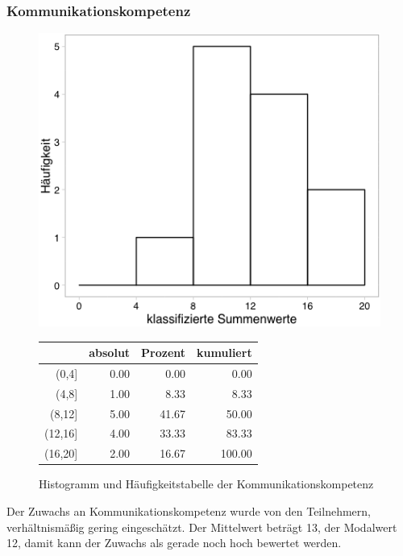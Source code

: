 \documentclass[12pt, bibliography=totoc]{scrartcl}
\begin{document}
\subsubsection{Kommunikationskompetenz}\label{kommunikationskompetenz}

\begin{figure}[H]
\begin{minipage}{.4\linewidth}
\includegraphics[width=0.8\linewidth]{Anhang/KKHistnn.png}

\label{pic:aufbau}
\end{minipage}
\begin{minipage}{.4\linewidth}
\centering
\raisebox{\depth}
{\begin{tabular}{rrrr}
  \hline
 & absolut & Prozent & kumuliert \\
  \hline
(0,4] & 0.00 & 0.00 & 0.00 \\
  (4,8] & 1.00 & 8.33 & 8.33 \\
  (8,12] & 5.00 & 41.67 & 50.00 \\
  (12,16] & 4.00 & 33.33 & 83.33 \\
  (16,20] & 2.00 & 16.67 & 100.00 \\
   \hline
\end{tabular}

}
\label{tab:defis}
\end{minipage}
\caption{Histogramm und Häufigkeitstabelle der Kommunikationskompetenz}
\label{fig:KK}
\end{figure}

Der Zuwachs an Kommunikationskompetenz wurde von den Teilnehmern,
verhältnismäßig gering eingeschätzt. Der Mittelwert beträgt 13, der
Modalwert 12, damit kann der Zuwachs als gerade noch hoch bewertet
werden.
\end{document}
